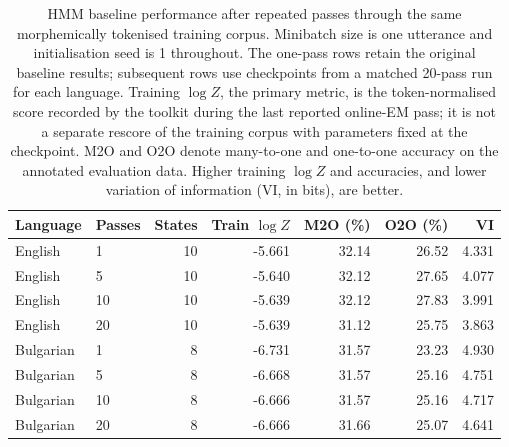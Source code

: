 \begin{table}[htbp]
\centering
\small
\begin{tabular}{llrrrrr}
\hline
Language & Passes & States & Train $\log Z$ & M2O (\%) & O2O (\%) & VI \\
\hline
English & 1 & 10 & -5.661 & 32.14 & 26.52 & 4.331 \\
English & 5 & 10 & -5.640 & 32.12 & 27.65 & 4.077 \\
English & 10 & 10 & -5.639 & 32.12 & 27.83 & 3.991 \\
English & 20 & 10 & -5.639 & 31.12 & 25.75 & 3.863 \\
\hline
Bulgarian & 1 & 8 & -6.731 & 31.57 & 23.23 & 4.930 \\
Bulgarian & 5 & 8 & -6.668 & 31.57 & 25.16 & 4.751 \\
Bulgarian & 10 & 8 & -6.666 & 31.57 & 25.16 & 4.717 \\
Bulgarian & 20 & 8 & -6.666 & 31.66 & 25.07 & 4.641 \\
\hline
\end{tabular}
\caption{HMM baseline performance after repeated passes through the same morphemically tokenised training corpus. Minibatch size is one utterance and initialisation seed is 1 throughout. The one-pass rows retain the original baseline results; subsequent rows use checkpoints from a matched 20-pass run for each language. Training $\log Z$, the primary metric, is the token-normalised score recorded by the toolkit during the last reported online-EM pass; it is not a separate rescore of the training corpus with parameters fixed at the checkpoint. M2O and O2O denote many-to-one and one-to-one accuracy on the annotated evaluation data. Higher training $\log Z$ and accuracies, and lower variation of information (VI, in bits), are better.}
\label{tab:hmm_iteration_baselines}
\end{table}
